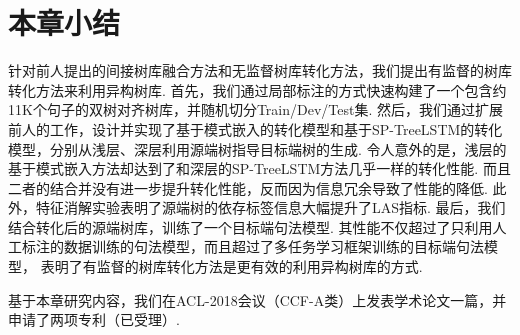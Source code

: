 \section{本章小结}
针对前人提出的间接树库融合方法和无监督树库转化方法，我们提出有监督的树库转化方法来利用异构树库.
首先，我们通过局部标注的方式快速构建了一个包含约11K个句子的双树对齐树库，并随机切分Train/Dev/Test集.
然后，我们通过扩展前人的工作，设计并实现了基于模式嵌入的转化模型和基于SP-TreeLSTM的转化模型，分别从浅层、深层利用源端树指导目标端树的生成.
令人意外的是，浅层的基于模式嵌入方法却达到了和深层的SP-TreeLSTM方法几乎一样的转化性能. 而且二者的结合并没有进一步提升转化性能，反而因为信息冗余导致了性能的降低.
此外，特征消解实验表明了源端树的依存标签信息大幅提升了LAS指标.
最后，我们结合转化后的源端树库，训练了一个目标端句法模型. 其性能不仅超过了只利用人工标注的数据训练的句法模型，而且超过了多任务学习框架训练的目标端句法模型，
表明了有监督的树库转化方法是更有效的利用异构树库的方式.


基于本章研究内容，我们在ACL-2018会议（CCF-A类）上发表学术论文一篇，并申请了两项专利（已受理）.


